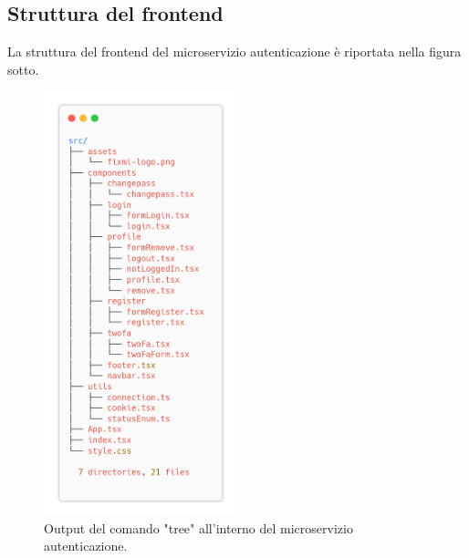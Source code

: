 \documentclass{report}
\begin{document}
\subsection{Struttura del frontend}
La struttura del frontend del microservizio autenticazione è riportata
nella figura sotto.
\begin{figure}[H]
	\centering\includegraphics[width=0.5\textwidth]{images/microservizio-autenticazione/frontend-structure.png}
	\caption{Output del comando "tree" all'interno del microservizio autenticazione.}
\end{figure}
\end{document}

